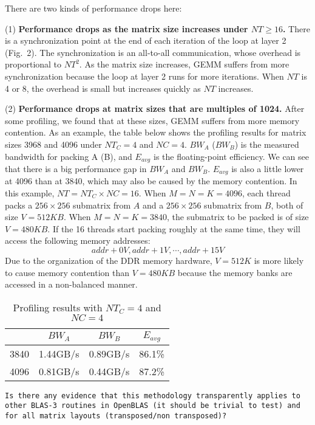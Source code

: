 \documentclass[]{article}
\begin{document}
There are two kinds of performance drops here:

(1) {\bf Performance drops as the matrix size increases 
under $NT \ge 16$.}
There is a synchronization point at the end of each iteration
of the loop at layer 2 (Fig.~2).
The synchronization is an all-to-all 
communication, whose overhead is proportional to $NT^2$.
As the matrix size increases, GEMM suffers
from more synchronization because
the loop at layer 2 runs for more iterations.
When $NT$ is 4 or 8, the overhead is small but
increases quickly as $NT$ increases.

(2) {\bf Performance drops at matrix sizes that are
multiples of 1024.}
After some  profiling, we found that at these sizes,
GEMM suffers from more memory contention.
As an example, the table below shows the profiling results
for matrix sizes 3968 and 4096
under $NT_C=4$ and $NC=4$.
$BW_{A}$ ($BW_{B}$) is the measured bandwidth for 
packing A (B), and
$E_{avg}$ is the floating-point efficiency.
We can see that there is a big performance gap
in $BW_{A}$ and $BW_{B}$.
$E_{avg}$ is also a little lower at 4096 than at 3840,
which may also be caused by the memory contention.
In this example, $NT=NT_C \times NC=16$.
When $M=N=K=4096$, each thread packs a $256 \times 256$ submatrix
from $A$ and a $256 \times 256$ submatrix from $B$,
both of size $V=512KB$.
When $M=N=K=3840$, the submatrix to be packed is 
of size $V=480KB$.
If the 16 threads start packing roughly at the same time,
they will access the following memory addresses:
$$addr+0V, addr+1V, \cdots, addr+15V$$
Due to the organization of the DDR memory hardware,
$V=512K$ is more likely to cause memory contention than $V=480KB$
because the memory banks are accessed in a non-balanced manner.

\begin{table}[h]
  \centering
  \caption{Profiling results with $NT_C=4$ and $NC=4$}
  \vspace{1em}
  \begin{tabular}{cccc}
    \toprule
         & $BW_A$   & $BW_B$   & $E_{avg}$\\
    \midrule
    3840 & 1.44GB/s & 0.89GB/s & 86.1\%   \\
    4096 & 0.81GB/s & 0.44GB/s & 87.2\%   \\
    \bottomrule
  \end{tabular}
\end{table}

\begin{verbatim}
Is there any evidence that this methodology transparently applies to 
other BLAS-3 routines in OpenBLAS (it should be trivial to test) and
for all matrix layouts (transposed/non transposed)?
\end{verbatim}
\end{document}
